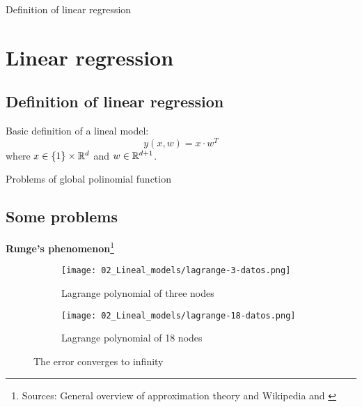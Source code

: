 \begin{frame}{Definition of linear regression}
    \section{Linear regression}  
    \subsection{Definition of linear regression}
    Basic definition of a lineal model: 
      \begin{equation}
        y(x,w) = x \cdot w^T
      \end{equation}
      where $x \in \{1\}\times\mathbb{R}^{d}$ and $w \in \mathbb{R}^{d+1}$. 
  \end{frame}
  
  \begin{frame}{Problems of global polinomial function}
    \subsection{Some problems}
    \textbf{Runge's phenomenon}\footnote{Sources: 
    General overview of approximation theory \cite{ACourseInApproximationTheory} 
    and Wikipedia \cite{Splines} and \cite{RungePhenomenon}}
    \begin{figure}
      \centering
      \begin{subfigure}[b]{0.4\textwidth}
          \centering
          \texttt{[image: 02\_Lineal\_models/lagrange-3-datos.png]}
          \caption[]%
          {{\small Lagrange polynomial of three nodes}}    
          \label{fig:mean and std of net14}
      \end{subfigure}
      \hfill
      \begin{subfigure}[b]{0.4\textwidth}   
          \centering 
          \texttt{[image: 02\_Lineal\_models/lagrange-18-datos.png]}
          \caption[]%
          {{\small Lagrange polynomial of 18 nodes}}    
          \label{fig:}
      \end{subfigure}
      \caption[ The error converges to infinity]
      {\small The error converges to infinity} 
      \label{fig:01errorToInfinty}
    \end{figure}
  \end{frame}
  
